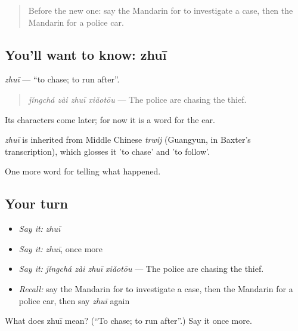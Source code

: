 \label{lesson:ZH-C311-zhui}



\begin{quote}
Before the new one: say the Mandarin for to investigate a case, then the Mandarin for a police car.
\end{quote}

\subsection*{You'll want to know: zhuī}
\emph{zhuī} — \textquotedblleft{}to chase; to run after\textquotedblright{}.

\begin{quote}
\emph{jǐngchá zài zhuī xiǎotōu} — The police are chasing the thief.
\end{quote}

Its characters come later; for now it is a word for the ear.

\begin{cousinweb}
\emph{zhuī} is inherited from Middle Chinese \emph{trwij} (Guangyun, in Baxter's transcription), which glosses it 'to chase' and 'to follow'.
\end{cousinweb}

\begin{grammarlens}[title={What you've built}]
One more word for telling what happened.
\end{grammarlens}

\subsection*{Your turn}
\begin{itemize}
\raggedright
  \item \emph{Say it:} \emph{zhuī}
  \item \emph{Say it:} \emph{zhuī}, once more
  \item \emph{Say it:} \emph{jǐngchá zài zhuī xiǎotōu} — The police are chasing the thief.
  \item \emph{Recall:} say the Mandarin for to investigate a case, then the Mandarin for a police car, then say \emph{zhuī} again
\end{itemize}

\begin{tcolorbox}[breakable,colback=teal!4,colframe=teal!35!black,title={Before you move on}]
What does zhuī mean? (\textquotedblleft{}To chase; to run after\textquotedblright{}.) Say it once more.
\end{tcolorbox}

